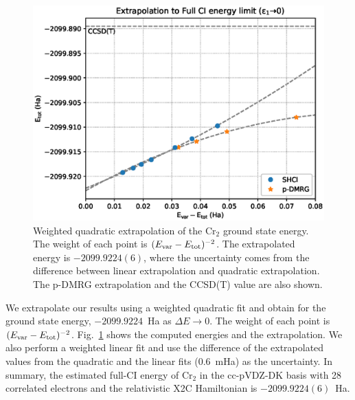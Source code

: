\documentclass[%
preprint,
 superscriptaddress,
 amsmath,amssymb,
 aps,
]{revtex4-1}
\begin{document}
\begin{figure}
  \includegraphics[width=\linewidth]{extrapolation/extrapolate.eps}
  \caption{Weighted quadratic extrapolation of the Cr$_2$ ground state energy.
  The weight of each point is $(E_{\rm var} - E_{\rm tot})^{-2}$.
  The extrapolated energy is $-2099.9224(6)$, where the uncertainty comes from the difference between linear extrapolation and quadratic extrapolation.
  The p-DMRG extrapolation and the CCSD(T) value are also shown.
}
  \label{fig:extrapolation}
\end{figure}

We extrapolate our results using a weighted quadratic fit
and obtain for the ground state energy, $-2099.9224$~Ha as $\Delta E\to0$.
The weight of each point is $(E_{\rm var} - E_{\rm tot})^{-2}$.
Fig.~\ref{fig:extrapolation} shows the computed energies and the extrapolation.
We also perform a weighted linear fit and use the difference of the extrapolated values from the quadratic and the linear fits (0.6~mHa) as the uncertainty.
In summary, the estimated full-CI energy of Cr$_2$ in the cc-pVDZ-DK basis with 28 correlated electrons and the relativistic X2C Hamiltonian
is $-2099.9224(6)$~Ha.
\end{document}
